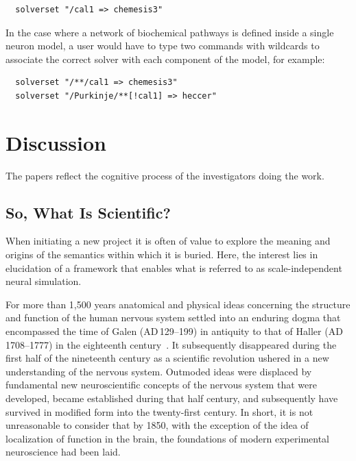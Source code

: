 \documentclass[11pt,3p,twocolumn]{JMN}
\begin{document}
\begin{tiny}
\begin{verbatim}
  solverset "/cal1 => chemesis3"
\end{verbatim}
\end{tiny}

In the case where a network of biochemical pathways is defined inside a single neuron model, a user would have to type two commands with wildcards to associate the correct solver with each component of the model, for example:

\begin{tiny}
\begin{verbatim}
  solverset "/**/cal1 => chemesis3"
  solverset "/Purkinje/**[!cal1] => heccer"
\end{verbatim}
\end{tiny}


\section{Discussion}

The papers reflect the cognitive process of the investigators doing the work.

\subsection{So, What Is Scientific?}

When initiating a new project it is often of value to explore the meaning and origins of the semantics within which it is buried. Here, the interest lies in elucidation of a framework that enables what is referred to as scale-independent neural simulation.

For more than 1,500 years anatomical and physical ideas concerning the structure and function of the human nervous system settled into an enduring dogma that encompassed the time of Galen (\small{AD}\,129--199) in antiquity to that of Haller (\small{AD}\,1708--1777) in the eighteenth century~\citep{clarke87}. It subsequently disappeared during the first half of the nineteenth century as a scientific revolution ushered in a new understanding of the nervous system. Outmoded ideas were displaced by fundamental new neuroscientific concepts of the nervous system that were developed, became established during that half century, and subsequently have survived in modified form into the twenty-first century. In short, it is not unreasonable to consider that by 1850, with the exception of the idea of localization of function in the brain, the foundations of modern experimental neuroscience had been laid.
\end{document}
